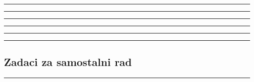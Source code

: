 \documentclass[10pt]{book}
\newcounter{zadatak} %
\newcounter{cjelina}
\begin{document}


{\color{boja} \rule{\linewidth}{0.3mm} }

\vspace{0.2cm} 




{\color{boja} \rule{\linewidth}{0.3mm} }

\vspace{0.2cm}





{\color{boja} \rule{\linewidth}{0.3mm} }


\setcounter{zadatak}{0}




{\color{boja} \rule{\linewidth}{0.3mm} }

\vspace{0.2cm} 




{\color{boja} \rule{\linewidth}{0.3mm} }

\vspace{0.2cm}





{\color{boja} \rule{\linewidth}{0.3mm} }


\subsection*{Zadaci za samostalni rad}



\vspace{0.2cm}


\vspace{0.2cm}


{\color{boja} \rule{\linewidth}{0.3mm} }

\vspace{0.2cm}


\vspace{0.2cm}
\end{document}
